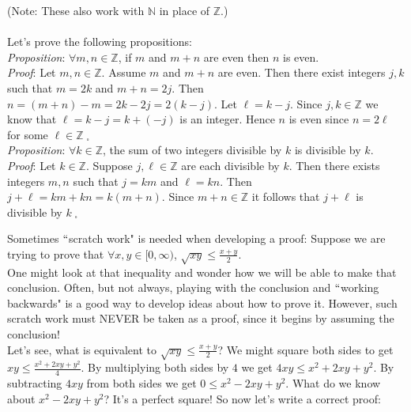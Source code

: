 \documentclass[12pt]{amsart}
\theoremstyle{definition}
\theoremstyle{remark}
\newcommand{\nats}{\mathbb N}
\newcommand{\ints}{\mathbb Z}
\begin{document}
(Note: These also work with $\nats$ in place of $\ints$.)\\ \\

Let's prove the following propositions:\\

\emph{Proposition}:  $\forall m,n\in\ints$, if $m$ and $m+n$ are even then $n$ is even.\\

\emph{Proof}:  Let $m,n\in\ints$.  Assume $m$ and $m+n$ are even.  Then there exist integers $j,k$ such that $m=2k$ and $m+n=2j$.  Then $n=(m+n)-m=2k-2j=2(k-j)$.  Let $\ell=k-j$.  Since $j,k\in\ints$ we know that $\ell=k-j=k+(-j)$ is an integer.  Hence $n$ is even since $n=2\ell$ for some $\ell\in\ints\;_{\square}$ \\

\emph{Proposition}: $\forall k\in\ints$, the sum of two integers divisible by $k$ is divisible by $k$.\\

\emph{Proof}:  Let $k\in\ints$.  Suppose $j,\ell\in\ints$ are each divisible by $k$.  Then there exists integers $m,n$ such that $j=km$ and $\ell=kn$.  Then $j+\ell=km+kn=k(m+n)$.  Since $m+n\in\ints$ it follows that $j+\ell$ is divisible by $k\;_{\square}$\\


\newpage

Sometimes $``$scratch work" is needed when developing a proof:  Suppose we are trying to prove that $\forall x,y\in [0,\infty)$, $\displaystyle \sqrt{xy}\leq \frac{x+y}{2}$.\\

One might look at that inequality and wonder how we will be able to make that conclusion.  Often, but not always, playing with the conclusion and $``$working backwards" is a good way to develop ideas about how to prove it.  However, such scratch work must NEVER be taken as a proof, since it begins by assuming the conclusion!\\

Let's see, what is equivalent to $\displaystyle \sqrt{xy}\leq \frac{x+y}{2}$?  We might square both sides to get\\ $\displaystyle xy\leq \frac{x^2+2xy+y^2}{4}$.  By multiplying both sides by $4$ we get $4xy\leq x^2+2xy+y^2$.  By subtracting $4xy$ from both sides we get $0\leq x^2-2xy+y^2$.  What do we know about $x^2-2xy+y^2$?  It's a perfect square!  So now let's write a correct proof:\\
\end{document}

